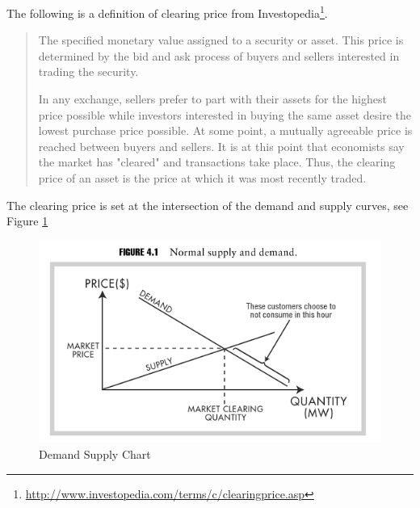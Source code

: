 The following is a definition of clearing price from Investopedia\footnote{\url{http://www.investopedia.com/terms/c/clearingprice.asp}}. 

\begin{quote}
The specified monetary value assigned to a security or asset. This price is determined by the bid and ask process of buyers and sellers interested in trading the security.

In any exchange, sellers prefer to part with their assets for the highest price possible while investors interested in buying the same asset desire the lowest purchase price possible. At some point, a mutually agreeable price is reached between buyers and sellers. It is at this point that economists say the market has "cleared" and transactions take place. Thus, the clearing price of an asset is the price at which it was most recently traded.
\end{quote}



%
%
%

The clearing price is set at the intersection of the demand and supply curves, see Figure \ref{fig:market_demand_supply}



\begin{figure}[!h]
	\centering
		\includegraphics{figures/methodology/market_demand_supply.PNG}
	\caption{Demand Supply Chart}
	\label{fig:market_demand_supply}
\end{figure}



